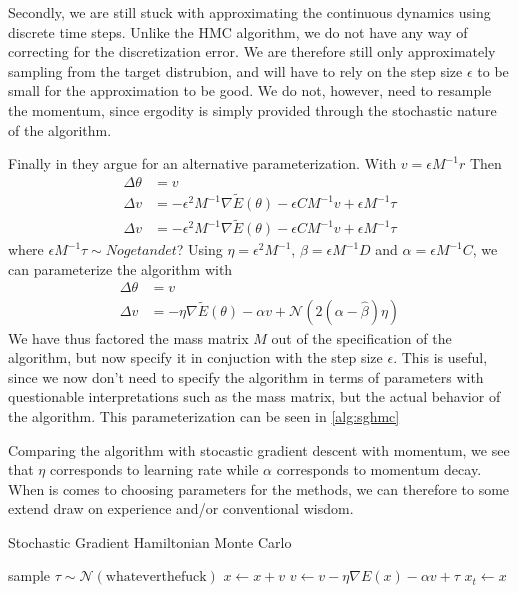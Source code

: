 Secondly, we are still stuck with approximating the continuous dynamics using discrete time steps. Unlike the HMC algorithm, we do not have any way of correcting for the discretization error. 
We are therefore still only approximately sampling from the target distrubion, and will have to rely on the step size $\epsilon$ to be small for the approximation to be good. We do not, however, need to resample the momentum, since ergodity is simply provided through the stochastic nature of the algorithm.

Finally in \cite{chen_stochastic_2014} they argue for an alternative parameterization. With $v = \epsilon M^{-1} r$ Then
\begin{align}
    \Delta \theta &=  v \\
    \Delta v &=  -\epsilon^2 M^{-1} \nabla\tilde{E}(\theta) - \epsilon CM^{-1}v  + \epsilon M^{-1}\tau \\
    \Delta v &=  -\epsilon^2 M^{-1} \nabla\tilde{E}(\theta) - \epsilon CM^{-1}v  + \epsilon M^{-1}\tau
\end{align}
where $\epsilon M^{-1}\tau\sim Noget andet$? Using $\eta = \epsilon^2M^{-1}$, $\beta = \epsilon M^{-1} D$ and $\alpha = \epsilon M^{-1}C$, we can parameterize the algorithm with
\begin{align}
    \Delta \theta &=  v \\
    \Delta v &=  -\eta \nabla\tilde{E}(\theta) - \alpha v  + \mathcal{N}(2(\alpha-\hat{\beta})\eta)
\end{align}
We have thus factored the mass matrix $M$ out of the specification of the algorithm, but now specify it in conjuction with the step size $\epsilon$. 
This is useful, since we now don't need to specify the algorithm in terms of parameters with questionable interpretations such as the mass matrix, but the actual behavior of the algorithm.
This parameterization can be seen in \cref{alg:sghmc}

Comparing the algorithm with stocastic gradient descent with momentum, we see that  $\eta$ corresponds to learning rate while $\alpha$ corresponds to momentum decay. 
When is comes to choosing parameters for the methods, we can therefore to some extend draw on experience and/or conventional wisdom.

\begin{algorithm}[H]
    \caption{Stochastic Gradient Hamiltonian Monte Carlo} \label{alg:sghmc}
    \begin{algorithmic}
            \State sample $\tau \sim \mathcal{N}(\text{whateverthefuck})$
            \State $x\gets x + v $ 
            \State $v\gets v - \eta \nabla E(x) - \alpha v + \tau$
        \EndFor
        \State $x_{t} \gets x$
        \EndFor
        \end{algorithmic}
    \end{algorithm}

